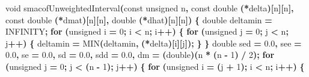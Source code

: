 \documentclass[
  12pt,
]{article}
\newenvironment{Shaded}{\begin{snugshade}}{\end{snugshade}}
\newcommand{\ControlFlowTok}[1]{\textcolor[rgb]{0.13,0.29,0.53}{\textbf{#1}}}
\newcommand{\DataTypeTok}[1]{\textcolor[rgb]{0.13,0.29,0.53}{#1}}
\newcommand{\DecValTok}[1]{\textcolor[rgb]{0.00,0.00,0.81}{#1}}
\newcommand{\FloatTok}[1]{\textcolor[rgb]{0.00,0.00,0.81}{#1}}
\newcommand{\NormalTok}[1]{#1}
\newcommand{\OperatorTok}[1]{\textcolor[rgb]{0.81,0.36,0.00}{\textbf{#1}}}
\begin{document}
\begin{Shaded}
\begin{Highlighting}[]
\DataTypeTok{void}\NormalTok{ smacofUnweightedInterval}\OperatorTok{(}\DataTypeTok{const} \DataTypeTok{unsigned}\NormalTok{ n}\OperatorTok{,} \DataTypeTok{const} \DataTypeTok{double} \OperatorTok{(*}\NormalTok{delta}\OperatorTok{)[}\NormalTok{n}\OperatorTok{][}\NormalTok{n}\OperatorTok{],}
                              \DataTypeTok{const} \DataTypeTok{double} \OperatorTok{(*}\NormalTok{dmat}\OperatorTok{)[}\NormalTok{n}\OperatorTok{][}\NormalTok{n}\OperatorTok{],}
                              \DataTypeTok{double} \OperatorTok{(*}\NormalTok{dhat}\OperatorTok{)[}\NormalTok{n}\OperatorTok{][}\NormalTok{n}\OperatorTok{])} \OperatorTok{\{}
    \DataTypeTok{double}\NormalTok{ deltamin }\OperatorTok{=}\NormalTok{ INFINITY}\OperatorTok{;}
    \ControlFlowTok{for} \OperatorTok{(}\DataTypeTok{unsigned}\NormalTok{ i }\OperatorTok{=} \DecValTok{0}\OperatorTok{;}\NormalTok{ i }\OperatorTok{\textless{}}\NormalTok{ n}\OperatorTok{;}\NormalTok{ i}\OperatorTok{++)} \OperatorTok{\{}
        \ControlFlowTok{for} \OperatorTok{(}\DataTypeTok{unsigned}\NormalTok{ j }\OperatorTok{=} \DecValTok{0}\OperatorTok{;}\NormalTok{ j }\OperatorTok{\textless{}}\NormalTok{ n}\OperatorTok{;}\NormalTok{ j}\OperatorTok{++)} \OperatorTok{\{}
\NormalTok{            deltamin }\OperatorTok{=}\NormalTok{ MIN}\OperatorTok{(}\NormalTok{deltamin}\OperatorTok{,} \OperatorTok{(*}\NormalTok{delta}\OperatorTok{)[}\NormalTok{i}\OperatorTok{][}\NormalTok{j}\OperatorTok{]);}
        \OperatorTok{\}}
    \OperatorTok{\}}
    \DataTypeTok{double}\NormalTok{ sed }\OperatorTok{=} \FloatTok{0.0}\OperatorTok{,}\NormalTok{ see }\OperatorTok{=} \FloatTok{0.0}\OperatorTok{,}\NormalTok{ se }\OperatorTok{=} \FloatTok{0.0}\OperatorTok{,}\NormalTok{ sd }\OperatorTok{=} \FloatTok{0.0}\OperatorTok{,}\NormalTok{ sdd }\OperatorTok{=} \FloatTok{0.0}\OperatorTok{,}
\NormalTok{           dm }\OperatorTok{=} \OperatorTok{(}\DataTypeTok{double}\OperatorTok{)(}\NormalTok{n }\OperatorTok{*} \OperatorTok{(}\NormalTok{n }\OperatorTok{{-}} \DecValTok{1}\OperatorTok{)} \OperatorTok{/} \DecValTok{2}\OperatorTok{);}
    \ControlFlowTok{for} \OperatorTok{(}\DataTypeTok{unsigned}\NormalTok{ j }\OperatorTok{=} \DecValTok{0}\OperatorTok{;}\NormalTok{ j }\OperatorTok{\textless{}} \OperatorTok{(}\NormalTok{n }\OperatorTok{{-}} \DecValTok{1}\OperatorTok{);}\NormalTok{ j}\OperatorTok{++)} \OperatorTok{\{}
        \ControlFlowTok{for} \OperatorTok{(}\DataTypeTok{unsigned}\NormalTok{ i }\OperatorTok{=} \OperatorTok{(}\NormalTok{j }\OperatorTok{+} \DecValTok{1}\OperatorTok{);}\NormalTok{ i }\OperatorTok{\textless{}}\NormalTok{ n}\OperatorTok{;}\NormalTok{ i}\OperatorTok{++)} \OperatorTok{\{}

\end{Highlighting}
\end{Shaded}
\end{document}
